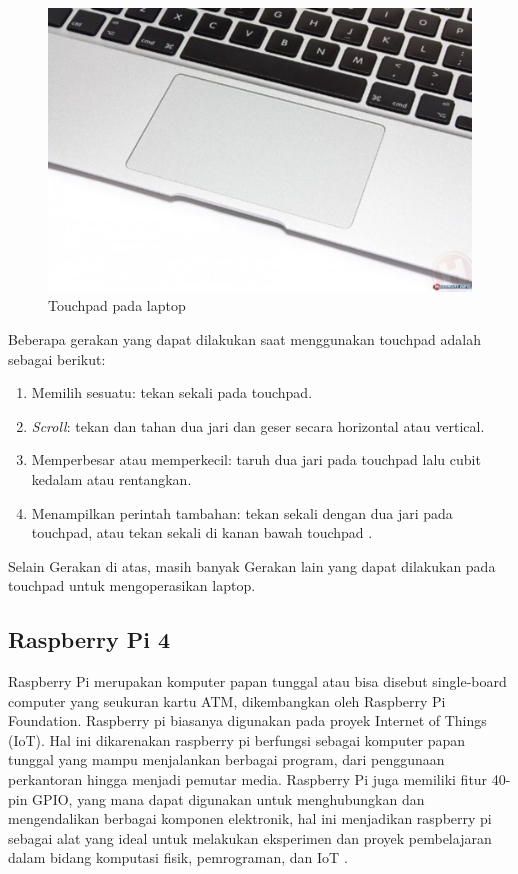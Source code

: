 \begin{figure} [H] \centering
  \includegraphics[scale=1]{gambar/Touchpad.jpg}
  \caption{Touchpad pada laptop \parencite{WinPoinPrecisionTouchpad}}
  \label{fig:metodelogi}
\end{figure}

Beberapa gerakan yang dapat dilakukan saat menggunakan touchpad adalah sebagai berikut:
\begin{enumerate}
    \item Memilih sesuatu: tekan sekali pada touchpad.
    \item \textit{Scroll}: tekan dan tahan dua jari dan geser secara horizontal atau vertical.
    \item Memperbesar atau memperkecil: taruh dua jari pada touchpad lalu cubit kedalam atau rentangkan.
    \item Menampilkan perintah tambahan: tekan sekali dengan dua jari pada touchpad, atau tekan sekali di kanan bawah touchpad \parencite{MicrosoftTouchGestures}.
\end{enumerate}
Selain Gerakan di atas, masih banyak Gerakan lain yang dapat dilakukan pada touchpad untuk mengoperasikan laptop.

\subsection{Raspberry Pi 4}
Raspberry Pi merupakan komputer papan tunggal atau bisa disebut single-board computer yang seukuran kartu ATM, dikembangkan oleh Raspberry Pi Foundation. Raspberry pi biasanya digunakan pada proyek Internet of Things (IoT). Hal ini dikarenakan raspberry pi berfungsi sebagai komputer papan tunggal yang mampu menjalankan berbagai program, dari penggunaan perkantoran hingga menjadi pemutar media. Raspberry Pi juga memiliki fitur 40-pin GPIO, yang mana dapat digunakan untuk menghubungkan dan mengendalikan berbagai komponen elektronik, hal ini menjadikan raspberry pi sebagai alat yang ideal untuk melakukan eksperimen dan proyek pembelajaran dalam bidang komputasi fisik, pemrograman, dan IoT \parencite{Besari24JamIoT}.

